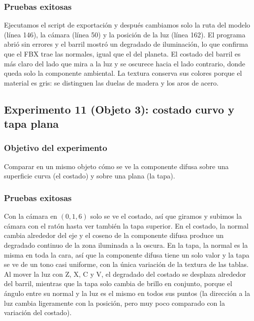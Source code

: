 \subsubsection{Pruebas exitosas}
Ejecutamos el script de exportación y después cambiamos solo la ruta del modelo (línea 146), la cámara (línea 50) y la posición de la luz (línea 162). El programa abrió sin errores y el barril mostró un degradado de iluminación, lo que confirma que el FBX trae las normales, igual que el del planeta. %
El costado del barril es más claro del lado que mira a la luz y se oscurece hacia el lado contrario, donde queda solo la componente ambiental. %
La textura conserva sus colores porque el material es gris: se distinguen las duelas de madera y los aros de acero. %
 
\subsection{Experimento 11 (Objeto 3): costado curvo y tapa plana}
 
\subsubsection{Objetivo del experimento}
Comparar en un mismo objeto cómo se ve la componente difusa sobre una superficie curva (el costado) y sobre una plana (la tapa).
 
\subsubsection{Pruebas exitosas}
Con la cámara en $(0, 1, 6)$ solo se ve el costado, así que giramos y subimos la cámara con el ratón hasta ver también la tapa superior. %
En el costado, la normal cambia alrededor del eje y el coseno de la componente difusa produce un degradado continuo de la zona iluminada a la oscura. En la tapa, la normal es la misma en toda la cara, así que la componente difusa tiene un solo valor y la tapa se ve de un tono casi uniforme, con la única variación de la textura de las tablas. %
Al mover la luz con Z, X, C y V, el degradado del costado se desplaza alrededor del barril, mientras que la tapa solo cambia de brillo en conjunto, porque el ángulo entre su normal y la luz es el mismo en todos sus puntos (la dirección a la luz cambia ligeramente con la posición, pero muy poco comparado con la variación del costado).
 
